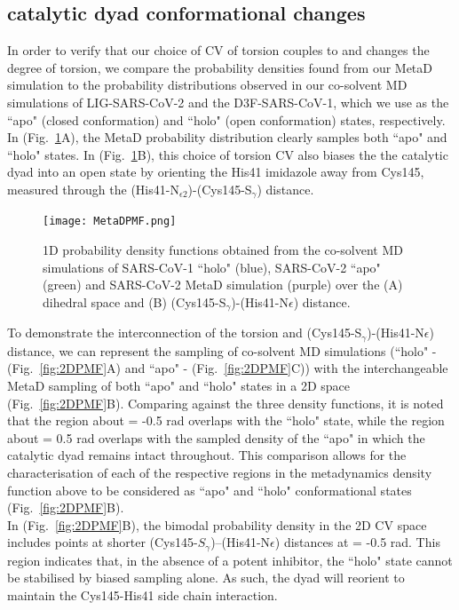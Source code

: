 \subsection{ catalytic dyad conformational changes}

In order to verify that our choice of CV of \dihone torsion couples to and changes the degree of \dihtwo torsion, we compare the probability densities found from our MetaD simulation to the probability distributions observed in our co-solvent MD simulations of LIG-SARS-CoV-2 and the D3F-SARS-CoV-1, which we use as the ``apo" (closed conformation) and ``holo" (open conformation) states, respectively. In (Fig.~\ref{fig:1Dim_PDF}A), the MetaD probability distribution clearly samples both ``apo" and ``holo" states. In (Fig.~\ref{fig:1Dim_PDF}B), this choice of \dihone torsion CV also biases the the catalytic dyad into an open state by orienting the His41 imidazole away from Cys145, measured through the (His41-N$_{\epsilon2}$)-(Cys145-S$_{\gamma}$) distance.\\

\begin{figure}
    \centering
    \texttt{[image: MetaDPMF.png]}
    \caption{1D probability density functions obtained from the co-solvent MD simulations of SARS-CoV-1 ``holo" (blue), SARS-CoV-2 ``apo" (green) and SARS-CoV-2 MetaD simulation (purple) over the (A) \dihtwo dihedral space and (B) (Cys145-S$_{\gamma}$)-(His41-N{$\epsilon$}) distance.} 
    \label{fig:1Dim_PDF}
\end{figure}

To demonstrate the interconnection of the \dihtwo torsion and (Cys145-S$_{\gamma}$)-(His41-N{$\epsilon$}) distance, we can represent the sampling of co-solvent MD simulations (``holo" - (Fig.~\ref{fig:2DPMF}A) and ``apo" - (Fig.~\ref{fig:2DPMF}C)) with the interchangeable MetaD sampling of both ``apo" and ``holo" states in a 2D space (Fig.~\ref{fig:2DPMF}B).  Comparing against the three density functions, it is noted that the region about \dihtwo = -0.5 rad overlaps with the ``holo" state, while the region about \dihtwo = 0.5 rad overlaps with the sampled density of the ``apo" in which the catalytic dyad remains intact throughout. This comparison allows for the characterisation of each of the respective regions in the metadynamics density function above to be considered as ``apo" and ``holo" conformational states (Fig.~\ref{fig:2DPMF}B).\\

In (Fig.~\ref{fig:2DPMF}B), the bimodal probability density in the 2D CV space includes points at shorter (Cys145-$S_{\gamma}$)--(His41-N{$\epsilon$}) distances at \dihtwo = -0.5 rad. This region indicates that, in the absence of a potent inhibitor, the ``holo" state cannot be stabilised by biased \dihone sampling alone. As such, the dyad will reorient to maintain the Cys145-His41 side chain interaction.\\

